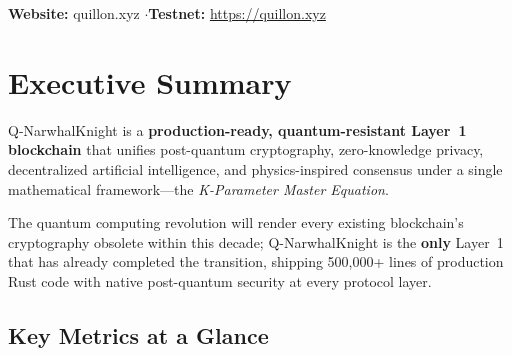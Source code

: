 \documentclass[11pt,a4paper]{article}
\begin{document}
\begin{center}
\vfill

{\small\textcolor{qnkslate}{
\textbf{Website:} quillon.xyz \quad$\cdot$\quad \textbf{Testnet:} \url{https://quillon.xyz}
}}

\end{center}
\newpage

\tableofcontents
\newpage

\section{Executive Summary}

Q-NarwhalKnight is a \textbf{production-ready, quantum-resistant Layer~1 blockchain} that unifies post-quantum cryptography, zero-knowledge privacy, decentralized artificial intelligence, and physics-inspired consensus under a single mathematical framework---the \textit{K-Parameter Master Equation}.

\begin{highlight}
The quantum computing revolution will render every existing blockchain's cryptography obsolete within this decade; Q-NarwhalKnight is the \textbf{only} Layer~1 that has already completed the transition, shipping 500,000+ lines of production Rust code with native post-quantum security at every protocol layer.
\end{highlight}

\subsection{Key Metrics at a Glance}
\end{document}
